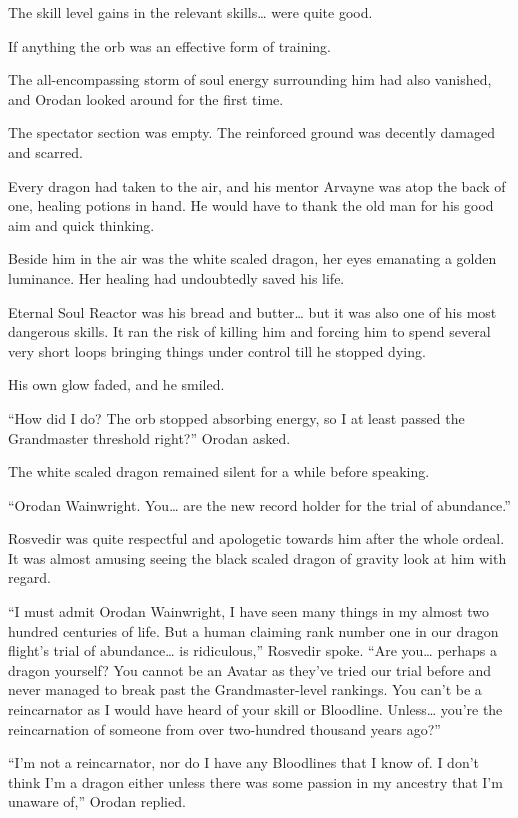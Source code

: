 \documentclass[a4paper,10pt]{book}
\begin{document}
The skill level gains in the relevant skills… were quite good.\par
If anything the orb was an effective form of training.\par
The all-encompassing storm of soul energy surrounding him had also vanished, and Orodan looked around for the first time.\par
The spectator section was empty. The reinforced ground was decently damaged and scarred.\par
Every dragon had taken to the air, and his mentor Arvayne was atop the back of one, healing potions in hand. He would have to thank the old man for his good aim and quick thinking.\par
Beside him in the air was the white scaled dragon, her eyes emanating a golden luminance. Her healing had undoubtedly saved his life.\par
Eternal Soul Reactor was his bread and butter… but it was also one of his most dangerous skills. It ran the risk of killing him and forcing him to spend several very short loops bringing things under control till he stopped dying.\par
His own glow faded, and he smiled.\par
“How did I do? The orb stopped absorbing energy, so I at least passed the Grandmaster threshold right?” Orodan asked.\par
The white scaled dragon remained silent for a while before speaking.\par
“Orodan Wainwright. You… are the new record holder for the trial of abundance.”\par
\par
Rosvedir was quite respectful and apologetic towards him after the whole ordeal. It was almost amusing seeing the black scaled dragon of gravity look at him with regard.\par
“I must admit Orodan Wainwright, I have seen many things in my almost two hundred centuries of life. But a human claiming rank number one in our dragon flight’s trial of abundance… is ridiculous,” Rosvedir spoke. “Are you… perhaps a dragon yourself? You cannot be an Avatar as they’ve tried our trial before and never managed to break past the Grandmaster-level rankings. You can’t be a reincarnator as I would have heard of your skill or Bloodline. Unless… you’re the reincarnation of someone from over two-hundred thousand years ago?”\par
“I’m not a reincarnator, nor do I have any Bloodlines that I know of. I don’t think I’m a dragon either unless there was some passion in my ancestry that I’m unaware of,” Orodan replied.\par
\end{document}

